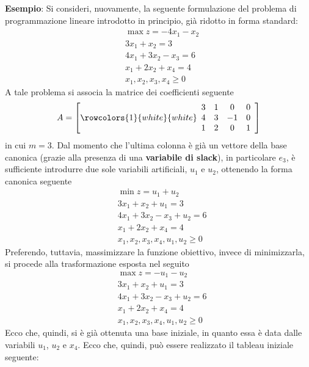 \documentclass[a4paper]{extarticle}
\begin{document}
\vspace{1em}
\noindent
\textbf{Esempio}: Si consideri, nuovamente, la seguente formulazione del problema di programmazione lineare introdotto in principio, già ridotto in forma standard:
\begin{align*}
    & \max z = -4x_1-x_2\\
    & 3x_1+x_2=3\\
    & 4x_1+3x_2-x_3=6\\
    & x_1+2x_2+x_4=4\\
    &x_1,x_2,x_3,x_4 \geq 0
\end{align*}
A tale problema si associa la matrice dei coefficienti seguente
\[
    A = \left[
    \rowcolors{1}{white}{white}
    \begin{array}{cccc}
        3 & 1 & 0 & 0\\
        4 & 3 & -1 & 0\\
        1 & 2 & 0 & 1
    \end{array}
\right]
\]
in cui $m=3$. Dal momento che l'ultima colonna è già un vettore della base canonica (grazie alla presenza di una \textbf{variabile di slack}), in particolare $e_3$, è sufficiente introdurre due sole variabili artificiali, $u_1$ e $u_2$, ottenendo la forma canonica seguente
\begin{align*}
    & \min z = u_1+u_2\\
    & 3x_1+x_2+u_1=3\\
    & 4x_1+3x_2-x_3+u_2=6\\
    & x_1+2x_2+x_4=4\\
    &x_1,x_2,x_3,x_4,u_1,u_2 \geq 0
\end{align*}
Preferendo, tuttavia, massimizzare la funzione obiettivo, invece di minimizzarla, si procede alla trasformazione esposta nel seguito
\begin{align*}
    & \max z =-u_1-u_2\\
    & 3x_1+x_2+u_1=3\\
    & 4x_1+3x_2-x_3+u_2=6\\
    & x_1+2x_2+x_4=4\\
    &x_1,x_2,x_3,x_4,u_1,u_2 \geq 0
\end{align*}
Ecco che, quindi, si è già ottenuta una base iniziale, in quanto essa è data dalle variabili $u_1$, $u_2$ e $x_4$. Ecco che, quindi, può essere realizzato il tableau iniziale seguente:
\end{document}
